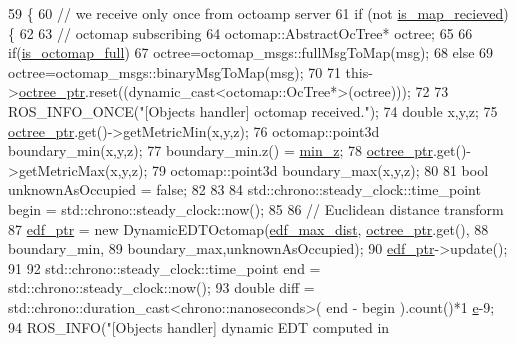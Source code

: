\begin{DoxyCode}
59                                                                    \{
60     \textcolor{comment}{// we receive only once from octoamp server}
61     \textcolor{keywordflow}{if} (not \hyperlink{class_objects_handler_acf1ef1b318defc2a39d87cea72689478}{is\_map\_recieved})\{
62 
63         \textcolor{comment}{// octomap subscribing }
64         octomap::AbstractOcTree* octree;
65 
66         \textcolor{keywordflow}{if}(\hyperlink{class_objects_handler_a56f70ac04c01e8b948a4b44fa5670f49}{is\_octomap\_full})
67             octree=octomap\_msgs::fullMsgToMap(msg);
68         \textcolor{keywordflow}{else}
69             octree=octomap\_msgs::binaryMsgToMap(msg);
70 
71         this->\hyperlink{class_objects_handler_a76ad7ca7513755408c02dd36dea94c6e}{octree\_ptr}.reset((dynamic\_cast<octomap::OcTree*>(octree)));
72 
73         ROS\_INFO\_ONCE(\textcolor{stringliteral}{"[Objects handler] octomap received."});
74         \textcolor{keywordtype}{double} x,y,z;
75         \hyperlink{class_objects_handler_a76ad7ca7513755408c02dd36dea94c6e}{octree\_ptr}.get()->getMetricMin(x,y,z);
76         octomap::point3d boundary\_min(x,y,z); 
77         boundary\_min.z() = \hyperlink{class_objects_handler_ac8c10c7a10aeb8abf1a44b7361f646e6}{min\_z};
78         \hyperlink{class_objects_handler_a76ad7ca7513755408c02dd36dea94c6e}{octree\_ptr}.get()->getMetricMax(x,y,z);
79         octomap::point3d boundary\_max(x,y,z); 
80 
81         \textcolor{keywordtype}{bool} unknownAsOccupied = \textcolor{keyword}{false};
82 
83 
84         std::chrono::steady\_clock::time\_point begin = std::chrono::steady\_clock::now();
85 
86         \textcolor{comment}{// Euclidean distance transform  }
87         \hyperlink{class_objects_handler_aa96d8c71f5e8c6423c88d3302220d4cf}{edf\_ptr} = \textcolor{keyword}{new} DynamicEDTOctomap(\hyperlink{class_objects_handler_ae71885df3c4e28f45be7bb0e5a383293}{edf\_max\_dist},
      \hyperlink{class_objects_handler_a76ad7ca7513755408c02dd36dea94c6e}{octree\_ptr}.get(),
88         boundary\_min,
89         boundary\_max,unknownAsOccupied);
90         \hyperlink{class_objects_handler_aa96d8c71f5e8c6423c88d3302220d4cf}{edf\_ptr}->update();    
91 
92         std::chrono::steady\_clock::time\_point end = std::chrono::steady\_clock::now();
93         \textcolor{keywordtype}{double} diff = std::chrono::duration\_cast<chrono::nanoseconds>( end - begin ).count()*1
      \hyperlink{namespace__setup__util_acdce690b925de33d6249bbbfa1109d61}{e}-9;
94         ROS\_INFO(\textcolor{stringliteral}{"[Objects handler] dynamic EDT computed in %
}
\end{DoxyCode}
